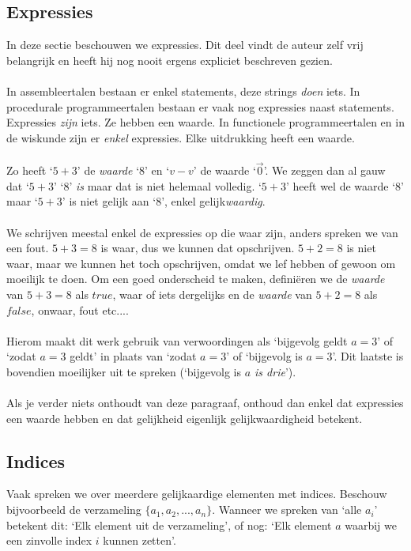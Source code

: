\documentclass[lineaire_algebra_oplossingen.tex]{subfiles}
\begin{document}
\subsection{Expressies}
In deze sectie beschouwen we expressies. Dit deel vindt de auteur zelf vrij belangrijk en heeft hij nog nooit ergens expliciet beschreven gezien.\\\\
In assembleertalen bestaan er enkel statements, deze strings \emph{doen} iets. In procedurale programmeertalen bestaan er vaak nog expressies naast statements. Expressies \emph{zijn} iets. Ze hebben een waarde. In functionele programmeertalen en in de wiskunde zijn er \emph{enkel} expressies. Elke uitdrukking heeft een waarde.\\\\
Zo heeft `$5+3$' de \emph{waarde} `$8$' en `$v-v$' de waarde `$\vec{0}$'. We zeggen dan al gauw dat `$5+3$' `$8$' \emph{is} maar dat is niet helemaal volledig. `$5+3$' heeft wel de waarde `$8$' maar `$5+3$' is niet gelijk aan `$8$', enkel gelijk\emph{waardig}.\\\\
We schrijven meestal enkel de expressies op die waar zijn, anders spreken we van een fout. $5+3=8$ is waar, dus we kunnen dat opschrijven. $5+2=8$ is niet waar, maar we kunnen het toch opschrijven, omdat we lef hebben of gewoon om moeilijk te doen. Om een goed onderscheid te maken, defini\"eren we de \emph{waarde} van $5+3=8$ als $true$, waar of iets dergelijks en de \emph{waarde} van $5+2=8$ als $false$, onwaar, fout etc....\\\\
Hierom maakt dit werk gebruik van verwoordingen als `bijgevolg geldt $a=3$' of `zodat $a=3$ geldt' in plaats van `zodat $a=3$' of `bijgevolg is $a=3$'.
Dit laatste is bovendien moeilijker uit te spreken (`bijgevolg is \emph{$a$ is drie}').\\\\
Als je verder niets onthoudt van deze paragraaf, onthoud dan enkel dat expressies een waarde hebben en dat gelijkheid eigenlijk gelijkwaardigheid betekent. 

\subsection{Indices}
Vaak spreken we over meerdere gelijkaardige elementen met indices. Beschouw bijvoorbeeld de verzameling $\{a_1,a_2,...,a_n\}$.
Wanneer we spreken van `alle $a_i$' betekent dit: `Elk element uit de verzameling', of nog: `Elk element $a$ waarbij we een zinvolle index $i$ kunnen zetten'.
 
\end{document}
